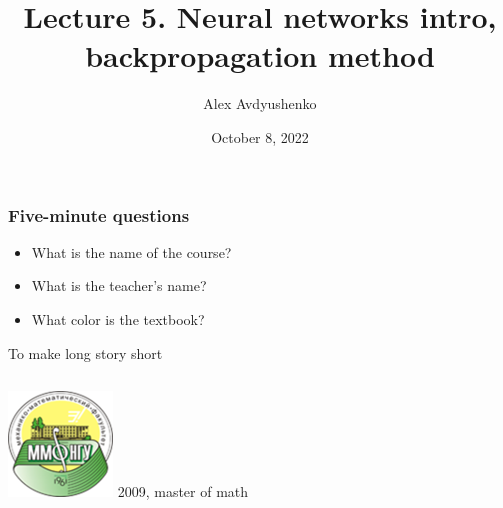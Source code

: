 \documentclass[fullscreen=true, bookmarks=true, hyperref={pdfencoding=unicode}]{beamer}
\title{Lecture 5. Neural networks intro, backpropagation method}
\author{Alex Avdyushenko}
\institute{Kazakh-British Technical University}
\date{October 8, 2022}
\begin{document}

\begin{frame}
\transdissolve[duration=0.2]
\titlepage
\end{frame}

\begin{frame}
  \frametitle{Five-minute questions}
  \begin{itemize}
    \item What is the name of the course?
    \item What is the teacher's name?
    \item What color is the textbook?
  \end{itemize}
\end{frame}

\begin{frame}{To make long story short}
\begin{columns}
    \small
    \begin{column}{.15\paperwidth}
      \includegraphics[keepaspectratio,       width=.15\paperwidth]{mmf.png}
      2009, master of math
      

\end{column}
\end{columns}
\end{frame}
\end{document}
